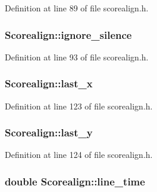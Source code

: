 Definition at line 89 of file scorealign.\+h.

\subsubsection[{\texorpdfstring{ignore\+\_\+silence}{ignore_silence}}]{ Scorealign\+::ignore\+\_\+silence}\hypertarget{class_scorealign_a604edf21b85319e10179bf5140d1e09b}{}\label{class_scorealign_a604edf21b85319e10179bf5140d1e09b}


Definition at line 93 of file scorealign.\+h.

\subsubsection[{\texorpdfstring{last\+\_\+x}{last_x}}]{ Scorealign\+::last\+\_\+x}\hypertarget{class_scorealign_a0b75402da0086bbdce6c20862c4f655f}{}\label{class_scorealign_a0b75402da0086bbdce6c20862c4f655f}


Definition at line 123 of file scorealign.\+h.

\subsubsection[{\texorpdfstring{last\+\_\+y}{last_y}}]{ Scorealign\+::last\+\_\+y}\hypertarget{class_scorealign_a2302f07302de5e9791320d7ae610ea71}{}\label{class_scorealign_a2302f07302de5e9791320d7ae610ea71}


Definition at line 124 of file scorealign.\+h.

\subsubsection[{\texorpdfstring{line\+\_\+time}{line_time}}]{\setlength{\rightskip}{0pt plus 5cm}double Scorealign\+::line\+\_\+time}\hypertarget{class_scorealign_a0e8480364897c190afc0c7fd432a78f7}{}\label{class_scorealign_a0e8480364897c190afc0c7fd432a78f7}


